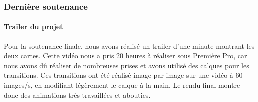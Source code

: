     \vspace{0.5cm}
    \subsubsection{Dernière soutenance}
    \vspace{0.5cm}

        \paragraph{Trailer du projet}

        Pour la soutenance finale, nous avons réalisé un trailer d'une minute montrant les deux cartes. Cette vidéo nous a pris 
        20 heures à réaliser sous Première Pro, car nous avons dû réaliser de nombreuses prises et avons utilisé des calques 
        pour les transitions. Ces transitions ont été réalisé image par image sur une vidéo à 60 images/s, en modifiant légèrement 
        le calque à la main. Le rendu final montre donc des animations très travaillées et abouties.